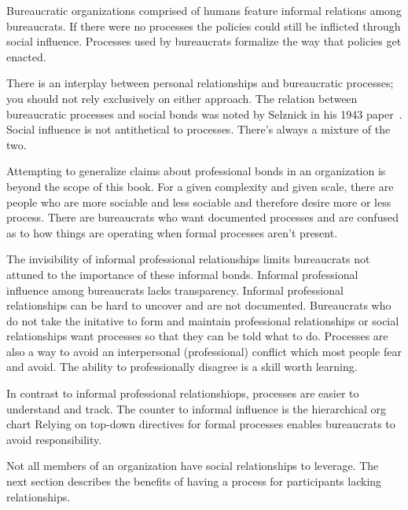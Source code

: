Bureaucratic organizations comprised of humans feature informal relations among bureaucrats. If there were no processes the policies could still be inflicted through social influence. Processes used by bureaucrats formalize the way that policies get enacted. 

There is an interplay between personal relationships and bureaucratic processes; you should not rely exclusively on either approach. The relation between bureaucratic processes and social bonds was noted by Selznick in his 1943 paper~\cite{1943_Selznick}. 
Social influence is not antithetical to processes. There's always a mixture of the two.

Attempting to generalize claims about professional bonds in an organization is beyond the scope of this book. 
For a given complexity and given scale, there are people who are more sociable and less sociable and therefore desire more or less process.
There are bureaucrats who want documented processes and are confused as to how things are operating when formal processes aren't present. 

The invisibility of informal professional relationships limits bureaucrats not attuned to the importance of these informal bonds. 
Informal professional influence among bureaucrats lacks transparency. Informal professional relationships can be hard to uncover and are not documented. 
Bureaucrats who do not take the initative to form and maintain professional relationships or social relationships want processes so that they can be told what to do. Processes are also a way to avoid an interpersonal (professional) conflict which most people fear and avoid. The ability to professionally disagree is a skill worth learning.

In contrast to informal professional relationshiops, processes are easier to understand and track. The counter to informal influence is the hierarchical 
\gls{org chart}%
\iftoggle{haspagenumbers}{ described on page~\pageref{sec:org-chart-as-guide-and-lie}.}{.}
Relying on top-down directives for formal processes enables bureaucrats to avoid responsibility.

Not all members of an organization have social relationships to leverage. The next section describes the benefits of having a process for participants lacking relationships.

